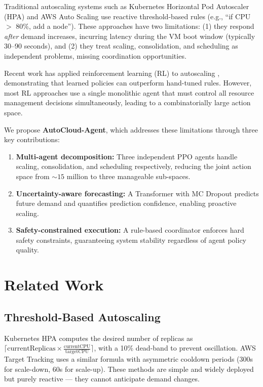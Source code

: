 \documentclass[12pt,a4paper]{article}
\begin{document}
Traditional autoscaling systems such as Kubernetes Horizontal Pod Autoscaler
(HPA) \cite{k8s_hpa} and AWS Auto Scaling use reactive threshold-based rules
(e.g., ``if CPU $>$ 80\%, add a node''). These approaches have two limitations:
(1) they respond \textit{after} demand increases, incurring latency during the
VM boot window (typically 30--90 seconds), and (2) they treat scaling,
consolidation, and scheduling as independent problems, missing coordination
opportunities.

Recent work has applied reinforcement learning (RL) to autoscaling
\cite{zhang2023aware, mao2016resource}, demonstrating that learned policies can
outperform hand-tuned rules. However, most RL approaches use a single monolithic
agent that must control all resource management decisions simultaneously,
leading to a combinatorially large action space.

We propose \textbf{AutoCloud-Agent}, which addresses these limitations through
three key contributions:

\begin{enumerate}
  \item \textbf{Multi-agent decomposition:} Three independent PPO agents handle
        scaling, consolidation, and scheduling respectively, reducing the joint
        action space from ${\sim}15$ million to three manageable sub-spaces.
  \item \textbf{Uncertainty-aware forecasting:} A Transformer with MC Dropout
        predicts future demand and quantifies prediction confidence, enabling
        proactive scaling.
  \item \textbf{Safety-constrained execution:} A rule-based coordinator enforces
        hard safety constraints, guaranteeing system stability regardless of
        agent policy quality.
\end{enumerate}


\section{Related Work}


\subsection{Threshold-Based Autoscaling}

Kubernetes HPA \cite{k8s_hpa} computes the desired number of replicas as
$\lceil \text{currentReplicas} \times \frac{\text{currentCPU}}{\text{targetCPU}}
\rceil$, with a 10\% dead-band to prevent oscillation. AWS Target Tracking uses
a similar formula with asymmetric cooldown periods (300s for scale-down, 60s for
scale-up). These methods are simple and widely deployed but purely reactive ---
they cannot anticipate demand changes.
\end{document}
